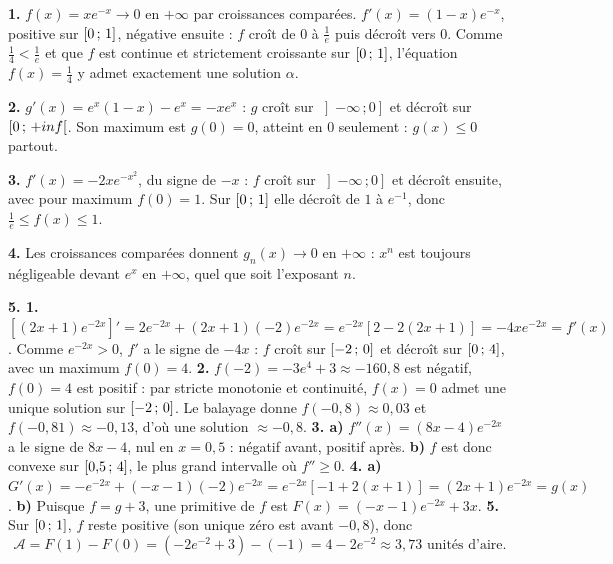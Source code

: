 \begin{corrige}[annales]
\textbf{1.} $f(x) = xe^{-x}\to0$ en $+\infty$ par croissances comparées.
$f'(x) = (1-x)e^{-x}$, positive sur $\left[0\,;\,1\right]$, négative ensuite :
$f$ croît de $0$ à $\frac1e$ puis décroît vers $0$. Comme
$\frac14 < \frac1e$ et que $f$ est continue et strictement croissante sur
$\left[0\,;\,1\right]$, l'équation $f(x) = \frac14$ y admet exactement une
solution $\alpha$.

\textbf{2.} $g'(x) = e^{x}(1-x)-e^{x} = -xe^{x}$ : $g$ croît sur
$\left]-\infty\,;0\right]$ et décroît sur $\left[0\,;\,+inf\right[$. Son
maximum est $g(0) = 0$, atteint en $0$ seulement : $g(x)\leq0$ partout.

\textbf{3.} $f'(x) = -2xe^{-x^{2}}$, du signe de $-x$ : $f$ croît sur
$\left]-\infty\,;0\right]$ et décroît ensuite, avec pour maximum $f(0) = 1$.
Sur $\left[0\,;\,1\right]$ elle décroît de $1$ à $e^{-1}$, donc
$\frac1e \leq f(x) \leq 1$.

\textbf{4.} Les croissances comparées donnent $g_{n}(x)\to0$ en $+\infty$ :
$x^{n}$ est toujours négligeable devant $e^{x}$ en $+\infty$, quel que soit
l'exposant $n$.

\textbf{5. 1.} $\left[(2x+1)e^{-2x}\right]' = 2e^{-2x}+(2x+1)(-2)e^{-2x}
= e^{-2x}\left[2-2(2x+1)\right] = -4xe^{-2x} = f'(x)$. Comme $e^{-2x}>0$,
$f'$ a le signe de $-4x$ : $f$ croît sur $\left[-2\,;\,0\right]$ et décroît sur
$\left[0\,;\,4\right]$, avec un maximum $f(0) = 4$.
\textbf{2.} $f(-2) = -3e^{4}+3 \approx -160{,}8$ est négatif, $f(0) = 4$ est
positif : par stricte monotonie et continuité, $f(x) = 0$ admet une unique
solution sur $\left[-2\,;\,0\right]$. Le balayage donne $f(-0{,}8)\approx0{,}03$
et $f(-0{,}81)\approx-0{,}13$, d'où une solution $\approx -0{,}8$.
\textbf{3. a)} $f''(x) = (8x-4)e^{-2x}$ a le signe de $8x-4$, nul en
$x = 0{,}5$ : négatif avant, positif après.
\textbf{b)} $f$ est donc convexe sur $\left[0{,}5\,;\,4\right]$, le plus grand
intervalle où $f''\geq0$.
\textbf{4. a)} $G'(x) = -e^{-2x}+(-x-1)(-2)e^{-2x}
= e^{-2x}\left[-1+2(x+1)\right] = (2x+1)e^{-2x} = g(x)$.
\textbf{b)} Puisque $f = g+3$, une primitive de $f$ est
$F(x) = (-x-1)e^{-2x}+3x$.
\textbf{5.} Sur $\left[0\,;\,1\right]$, $f$ reste positive (son unique zéro est
avant $-0{,}8$), donc
\[
  \mathcal{A} = F(1)-F(0) = \left(-2e^{-2}+3\right)-(-1)
  = 4-2e^{-2} \approx 3{,}73 \text{ unités d'aire.}
\]
\end{corrige}

